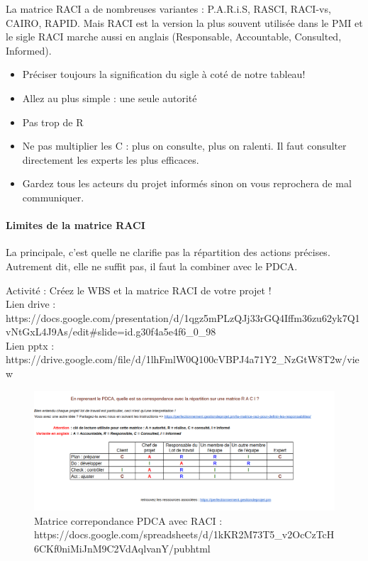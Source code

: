 La matrice RACI a de nombreuses variantes : P.A.R.i.S, RASCI, RACI-vs, CAIRO, RAPID. Mais RACI est la version la plus souvent utilisée dans le PMI et le sigle RACI marche aussi en anglais (Responsable, Accountable, Consulted, Informed).
\begin{danger}
	\begin{itemize}
	\item Préciser toujours la signification du sigle à coté de notre tableau!
	\item Allez au plus simple : une seule autorité
	\item Pas trop de R
	\item Ne pas multiplier les C : plus on consulte, plus on ralenti. Il faut consulter directement les experts les plus efficaces.
	\item Gardez tous les acteurs du projet informés sinon on vous reprochera de mal communiquer.
\end{itemize}
\end{danger}
\paragraph*{Limites de la matrice RACI}
La principale, c'est quelle ne clarifie pas la répartition des actions précises. Autrement dit, elle ne suffit pas, il faut la combiner avec le PDCA.

\begin{danger}
Activité : Créez le WBS et la matrice RACI de votre projet !\\
Lien drive : https://docs.google.com/presentation/d/1qgz5mPLzQJj33rGQ4Iffm36zu62yk7Q1vNtGxL4J9As/edit\#slide=id.g30f4a5e4f6\_0\_98\\
Lien pptx : https://drive.google.com/file/d/1lhFmlW0Q100cVBPJ4a71Y2\_NzGtW8T2w/view
\end{danger}
\begin{figure}[!h]
	\begin{center}
		\includegraphics[scale=0.6]{images/correpondance_pdca_raci.png}
		\caption{Matrice correpondance PDCA avec RACI : https://docs.google.com/spreadsheets/d/1kKR2M73T5\_v2OcCzTcH6CKf0niMiJnM9C2VdAqlvanY/pubhtml}
	\end{center}
\end{figure}
